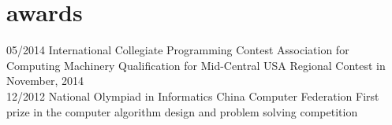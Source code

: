 \section{awards}

\begin{entrylist}
\entry
{05/2014}
{International Collegiate Programming Contest}
{Association for Computing Machinery}
{Qualification for Mid-Central USA Regional Contest in November, 2014\\}
\entry
{12/2012}
{National Olympiad in Informatics}
{China Computer Federation}
{First prize in the computer algorithm design and problem solving competition\\}
\end{entrylist}


